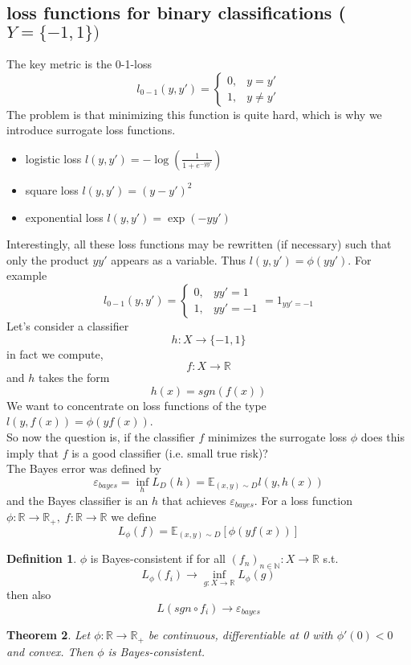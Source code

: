 \documentclass[a4paper, 12pt]{article}
\theoremstyle{plain}
\newtheorem{theorem}{Theorem}[subsection] %
\theoremstyle{definition}
\newtheorem{definition}[theorem]{Definition} %
\theoremstyle{lemma}
\theoremstyle{remark}
\theoremstyle{example}
\begin{document}
	\subsection{loss functions for binary classifications ($Y = \{-1,1\})$}
	The key metric is the 0-1-loss \[l_{0-1}(y,y') = \begin{cases}
		0, & y=y'\\
		1, & y\neq y'
	\end{cases}\]
	The problem is that minimizing this function is quite hard, which is why we introduce surrogate loss functions. \begin{itemize}
		\item logistic loss $l(y,y') = -\log\left(\frac{1}{1+e^{-yy'}}\right)$
		\item square loss $l(y,y') = (y-y')^2$
		\item exponential loss $l(y,y') = \exp(-yy')$
	\end{itemize}
	Interestingly, all these loss functions may be rewritten (if necessary) such that only the product $yy'$ appears as a variable. Thus $l(y,y') = \phi(yy')$. For example \[l_{0-1}(y,y') = \begin{cases}
			0, & yy'= 1\\
			1, & yy' = -1
	\end{cases} = 1_{yy'=-1}\]
	Let's consider a classifier \[h:X\to\{-1,1\}\] in fact we compute, \[f:X\to\mathbb{R}\] and $h$ takes the form \[h(x) = sgn(f(x))\]
	We want to concentrate on loss functions of the type $l(y,f(x)) = \phi(yf(x))$.\\
	So now the question is, if the classifier $f$ minimizes the surrogate loss $\phi$ does this imply that $f$ is a good classifier (i.e. small true risk)?\\
	The Bayes error was defined by \[\varepsilon_{bayes} = \inf_h L_D(h) = \mathbb{E}_{(x,y)\sim D} l(y,h(x))\] and the Bayes classifier is an $h$ that achieves $\varepsilon_{bayes}$. For a loss function $\phi: \mathbb{R} \to \mathbb{R}_+, \; f:\mathbb{R}\to\mathbb{R}$ we define \[L_\phi(f) = \mathbb{E}_{(x,y)\sim D} [\phi(yf(x))]\]
	\begin{definition}
		$\phi$ is Bayes-consistent if for all $(f_n)_{n \in \mathbb{N}}: X \to \mathbb{R}$ s.t. \[L_\phi(f_i) \to \inf_{g:X\to\mathbb{R}} L_\phi(g)\]
		then also \[L(sgn\circ f_i)\to\varepsilon_{bayes}\]
	\end{definition}
	\begin{theorem}
		Let $\phi: \mathbb{R} \to \mathbb{R}_+$ be continuous, differentiable at 0 with $\phi'(0)<0$ and convex. Then $\phi$ is Bayes-consistent.
	\end{theorem}
\end{document}
